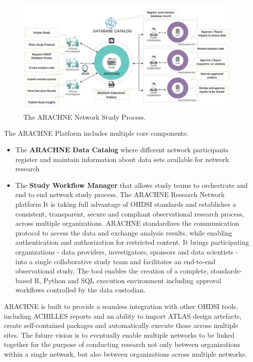 \documentclass[11pt]{book}
\providecommand{\tightlist}{%
  \setlength{\itemsep}{0pt}\setlength{\parskip}{0pt}}
\theoremstyle{definition}
\theoremstyle{definition}
\theoremstyle{definition}
\theoremstyle{remark}
\begin{document}
\begin{figure}
\includegraphics[width=1\linewidth]{images/NetworkStudies/ARACHNE} \caption{The ARACHNE Network Study Process.}\label{fig:arachne}
\end{figure}

The ARACHNE Platform includes multiple core components:

\begin{itemize}
\tightlist
\item
  The \textbf{ARACHNE Data Catalog} where different network participants register and maintain information about data sets available for network research
\item
  The \textbf{Study Workflow Manager} that allows study teams to orchestrate and end to end network study process. The ARACHNE Research Network platform It is taking full advantage of OHDSI standards and establishes a consistent, transparent, secure and compliant observational research process, across multiple organizations. ARACHNE standardizes the communication protocol to access the data and exchange analysis results, while enabling authentication and authorization for restricted content. It brings participating organizations - data providers, investigators, sponsors and data scientists - into a single collaborative study team and facilitates an end-to-end observational study. The tool enables the creation of a complete, standards-based R, Python and SQL execution environment including approval workflows controlled by the data custodian.
\end{itemize}

ARACHNE is built to provide a seamless integration with other OHDSI tools, including ACHILLES reports and an ability to import ATLAS design artefacts, create self-contained packages and automatically execute those across multiple sites. The future vision is to eventually enable multiple networks to be linked together for the purpose of conducting research not only between organizations within a single network, but also between organizations across multiple networks.
\end{document}
